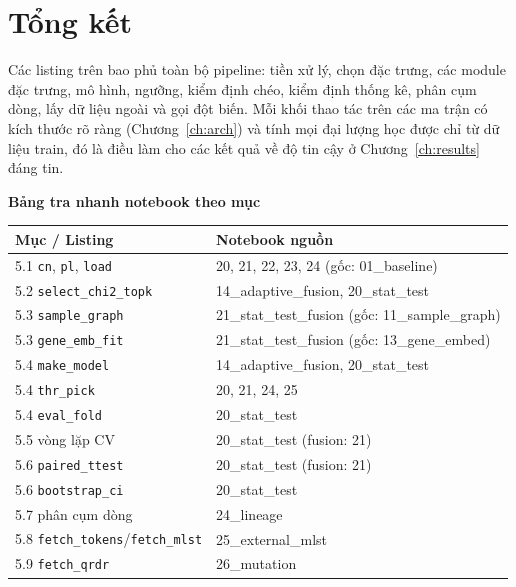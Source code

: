 \documentclass[../main.tex]{subfiles}
\begin{document}
\section{Tổng kết}

Các listing trên bao phủ toàn bộ pipeline: tiền xử lý, chọn đặc trưng, các module đặc trưng, mô hình, ngưỡng, kiểm định chéo, kiểm định thống kê, phân cụm dòng, lấy dữ liệu ngoài và gọi đột biến. Mỗi khối thao tác trên các ma trận có kích thước rõ ràng (Chương~\ref{ch:arch}) và tính mọi đại lượng học được chỉ từ dữ liệu train, đó là điều làm cho các kết quả về độ tin cậy ở Chương~\ref{ch:results} đáng tin.

\begin{center}\small
\textbf{Bảng tra nhanh notebook theo mục}\\[4pt]
\begin{tabular}{ll}
\hline
Mục / Listing & Notebook nguồn \\
\hline
5.1 \texttt{cn}, \texttt{pl}, \texttt{load} & 20, 21, 22, 23, 24 (gốc: 01\_baseline) \\
5.2 \texttt{select\_chi2\_topk} & 14\_adaptive\_fusion, 20\_stat\_test \\
5.3 \texttt{sample\_graph} & 21\_stat\_test\_fusion (gốc: 11\_sample\_graph) \\
5.3 \texttt{gene\_emb\_fit} & 21\_stat\_test\_fusion (gốc: 13\_gene\_embed) \\
5.4 \texttt{make\_model} & 14\_adaptive\_fusion, 20\_stat\_test \\
5.4 \texttt{thr\_pick} & 20, 21, 24, 25 \\
5.4 \texttt{eval\_fold} & 20\_stat\_test \\
5.5 vòng lặp CV & 20\_stat\_test (fusion: 21) \\
5.6 \texttt{paired\_ttest} & 20\_stat\_test (fusion: 21) \\
5.6 \texttt{bootstrap\_ci} & 20\_stat\_test \\
5.7 phân cụm dòng & 24\_lineage \\
5.8 \texttt{fetch\_tokens}/\texttt{fetch\_mlst} & 25\_external\_mlst \\
5.9 \texttt{fetch\_qrdr} & 26\_mutation \\
\hline
\end{tabular}
\end{center}
\end{document}
